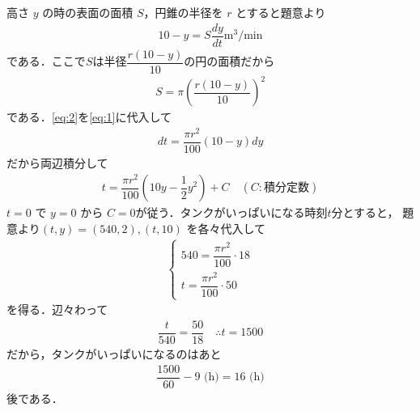 \documentclass[../../main.tex]{subfiles}
\begin{document}
高さ $y$ の時の表面の面積 $S$，円錐の半径を $r$ とすると題意より
\begin{align}
  10 - y = S \dfrac{dy}{dt} \mathrm{m^3/min} \label{eq:1}
\end{align}
である．ここで$S$は半径$\dfrac{r(10-y)}{10}$の円の面積だから
\begin{align}
  S = \pi \left( \dfrac{r(10-y)}{10} \right)^2 \label{eq:2}
\end{align}
である．\cref{eq:2}を\cref{eq:1}に代入して
\begin{align}
  dt = \dfrac{\pi r^2}{100}(10-y)dy
\end{align}
だから両辺積分して
\begin{align}
  t = \dfrac{\pi r^2}{100}\left(10y - \dfrac{1}{2}y^2\right) + C \quad (C:\text{積分定数})
\end{align}
$t=0$ で $y=0$ から $C=0$が従う．タンクがいっぱいになる時刻$t$分とすると，
題意より$(t, y) = (540, 2), (t,10)$ を各々代入して
\begin{align}
  \begin{cases}
    540 = \dfrac{\pi r^2}{100} \cdot 18 \\
    t = \dfrac{\pi r^2}{100} \cdot 50
  \end{cases}
\end{align}
を得る．辺々わって
\begin{align}
  \dfrac{t}{540} = \dfrac{50}{18}
  \quad\therefore
  t = 1500
\end{align}
だから，タンクがいっぱいになるのはあと
\begin{align}
  \dfrac{1500}{60} - 9 \text{ (h)} = 16 \text{ (h)}
\end{align}
後である．
\end{document}
